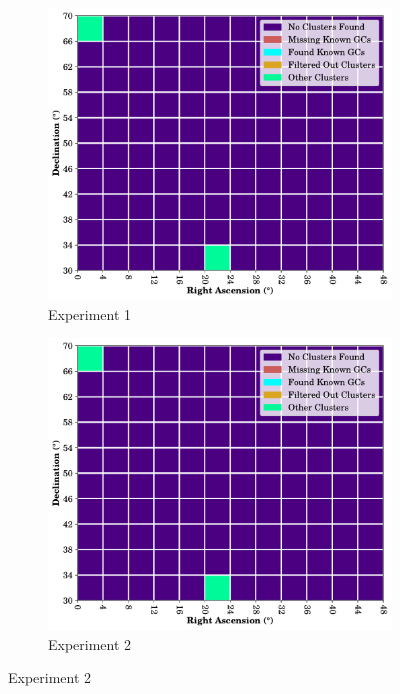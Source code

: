 \begin{figure}[H]
    \centering
    \caption{\label{fig:a4-cluster-overview}Clustering Results Across A4 for All Experiments}
    \begin{subfigure}[b]{0.49\textwidth}
        \includegraphics[width=\textwidth]{./figures/rasters/grids/grid-run-01-a4.pdf}
        \caption{Experiment 1}
    \end{subfigure}
    \begin{subfigure}[b]{0.49\textwidth}
        \includegraphics[width=\textwidth]{./figures/rasters/grids/grid-run-02-a4.pdf}
        \caption{Experiment 2}
    \end{subfigure}


\end{figure}

